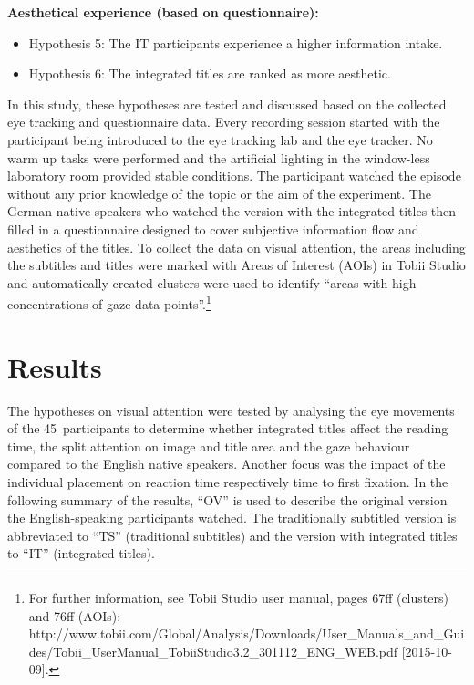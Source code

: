 \documentclass[output=paper]{langsci/langscibook}
\begin{document}
\textbf{Aesthetical experience (based on questionnaire):}

\begin{itemize}
\item Hypothesis 5: The IT participants experience a higher information intake.
\item Hypothesis 6: The integrated titles are ranked as more aesthetic.
\end{itemize}


In this study, these hypotheses are tested and discussed based on the collected eye tracking and questionnaire data. Every recording session started with the participant being introduced to the eye tracking lab and the eye tracker. No warm up tasks were performed and the artificial lighting in the window-less laboratory room provided stable conditions. The participant watched the episode without any prior knowledge of the topic or the aim of the experiment. The German native speakers who watched the version with the integrated titles then filled in a questionnaire designed to cover subjective information flow and aesthetics of the titles. To collect the data on visual attention, the areas including the subtitles and titles were marked with Areas of Interest (AOIs) in Tobii Studio and automatically created clusters were used to identify ``areas with high concentrations of gaze data points''.\footnote{For further information, see Tobii Studio user manual, pages 67ff (clusters) and 76ff (AOIs): http://www.tobii.com/Global/Analysis/Downloads/User\_Manuals\_and\_Guides/Tobii\_UserManual\_TobiiStudio3.2\_301112\_ENG\_WEB.pdf [2015-10-09].}

\section{Results}

The hypotheses on visual attention were tested by analysing the eye movements of the 45~participants to determine whether integrated titles affect the reading time, the split attention on image and title area and the gaze behaviour compared to the English native speakers. Another focus was the impact of the individual placement on reaction time respectively time to first fixation. In the following summary of the results, ``OV'' is used to describe the original version the English-speaking participants watched. The traditionally subtitled version is abbreviated to ``TS'' (traditional subtitles) and the version with integrated titles to ``IT'' (integrated titles).
\end{document}
